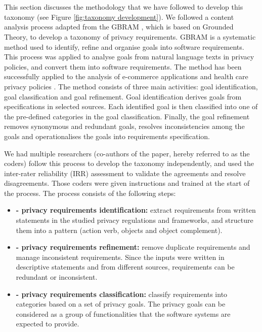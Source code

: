 \section{} \label{sec:taxonomy-development}

This section discusses the methodology that we have followed to develop this taxonomy  (see Figure \ref{fig:taxonomy development}). We followed a content analysis process adapted from the GBRAM \cite{Antn2004}, which is based on Grounded Theory, to develop a taxonomy of privacy requirements. GBRAM is a systematic method used to identify, refine and organise goals into software requirements. This process was applied to analyse goals from natural language texts in privacy policies, and convert them into software requirements. The method has been successfully applied to the analysis of e-commerce applications \cite{Anton1998} and health care privacy policies \cite{Antn2004}. The method consists of three main activities: goal identification, goal classification and goal refinement. Goal identification derives goals from specifications in selected sources. Each identified goal is then classified into one of the pre-defined categories in the goal classification. Finally, the goal refinement removes synonymous and redundant goals, resolves inconsistencies among the goals and operationalises the goals into requirements specification. 

We had multiple researchers (co-authors of the paper, hereby referred to as the coders) follow this process to develop the taxonomy independently, and used the inter-rater reliability (IRR) assessment to validate the agreements and resolve disagreements. Those coders were given instructions and trained at the start of the process. The process consists of the following steps:

\begin{itemize}[leftmargin=*, noitemsep]
	\item \textbf{ - privacy requirements identification:} extract requirements from written statements in the studied privacy regulations and frameworks, and structure them into a pattern (action verb, objects and object complement).
	
	\item \textbf{ - privacy requirements refinement:} remove duplicate requirements and manage inconsistent requirements. Since the inputs were written in descriptive statements and from different sources, requirements can be redundant or inconsistent.
	
	\item \textbf{ - privacy requirements classification:} classify requirements into categories based on a set of privacy goals. The privacy goals can be considered as a group of functionalities that the software systems are expected to provide.
\end{itemize}

